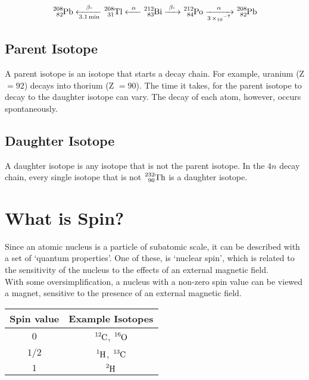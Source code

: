 \documentclass{article}
\begin{document}
\begin{multicols*}{2}
    \begin{equation*}
      \begin{split}
        \ce{^{208}_{82}Pb <-[\beta{-}][3.1 min] ^{208}_{31}Tl <-[\alpha] ^{212}_{83}Bi
            ->[\beta{-}] ^{212}_{84}Po ->[\alpha][3 \times 10^{-7}]
            ^{208}_{82}Pb}
      \end{split}
    \end{equation*}

    \subsection{Parent Isotope}
    A parent isotope is an isotope that starts a decay chain. For example, uranium
    (Z $=92$) decays into thorium (Z $=90$). The time it takes, for the parent isotope
    to decay to the daughter isotope can vary. The decay of each atom, however, occurs
    spontaneously.

    \subsection{Daughter Isotope}
    A daughter isotope is any isotope that is not the parent isotope. In the $4n$ decay
    chain, every single isotope that is not $\ce{^{232}_{90}Th}$ is a daughter isotope. 

    \section{What is Spin?}
    Since an atomic nucleus is a particle of subatomic scale, it can be
    described with a set of `quantum properties'. One of these, is `nuclear
    spin', which is related to the sensitivity of the nucleus to the effects
    of an external magnetic field.\\

    With some oversimplification, a nucleus with a non-zero spin value
    can be viewed a magnet, sensitive to the presence of an external magnetic
    field.\\

    \begin{tabular}{|c|c|}
      \hline
      Spin value & Example Isotopes \\
      \hline
      $0$ & $\ce{^{12}C}$, $\ce{^{16}O}$ \\
      $1/2$ & $\ce{^{1}H}$, $\ce{^{13}C}$ \\
      $1$ & $\ce{^{2}H}$ \\
      \hline
    \end{tabular}


\end{multicols*}
\end{document}
